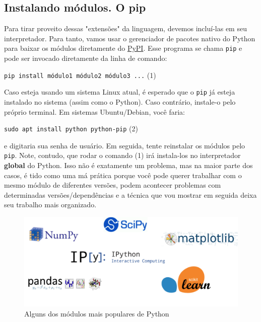 \documentclass{article}
\begin{document}
	\subsection{Instalando módulos. O pip}

	Para tirar proveito dessas "extensões" da linguagem, devemos incluí-las em seu interpretador. Para tanto, vamos usar
	o gerenciador de pacotes nativo do Python para baixar os módulos diretamente do \href{https://pypi.org/}{PyPI}.
	Esse programa se chama \texttt{pip} e pode ser invocado diretamente da linha de comando: 

	\vspace{1ex}
	\texttt{pip install módulo1 módulo2 módulo3 ...} (1)
	\vspace{1ex} 

	Caso esteja usando um sistema Linux atual, é esperado que o \texttt{pip} já esteja instalado no sistema (assim como o Python). 
	Caso contrário, instale-o pelo próprio terminal. Em sistemas Ubuntu/Debian, você faria: 

	\vspace{1ex} 
	\texttt{sudo apt install python python-pip} (2)
	\vspace{1ex} 

	e digitaria sua senha de usuário. Em seguida, tente reinstalar os módulos pelo \texttt{pip}. Note, contudo, que rodar o comando 
	(1) irá instala-los no interpretador \textbf{global} do Python. Isso não é exatamente um problema, mas na maior 
	parte dos casos, é tido como uma má prática porque você pode querer trabalhar com o mesmo módulo de diferentes versões,
	podem acontecer problemas com determinadas versões/dependências e a técnica que vou mostrar em seguida deixa seu trabalho
	mais organizado. 

	\begin{figure}[ht!]
  		\centering
		\includegraphics[scale=0.2]{figs/modules.png} 
  		\caption*{Alguns dos módulos mais populares de Python}
	\end{figure}
\end{document}
